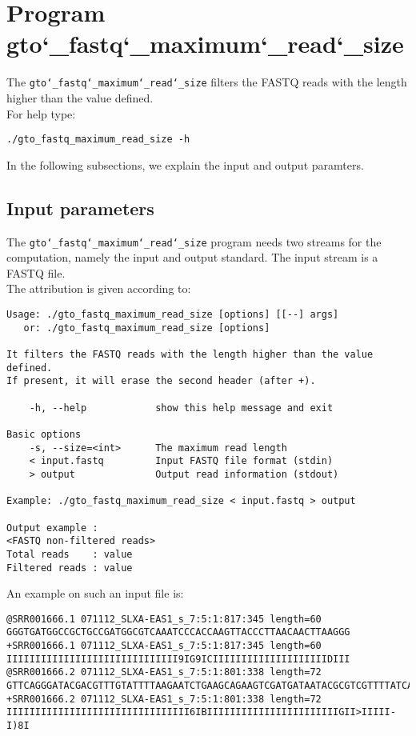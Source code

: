 \section{Program gto\char`_fastq\char`_maximum\char`_read\char`_size}
The \texttt{gto\char`_fastq\char`_maximum\char`_read\char`_size} filters the FASTQ reads with the length higher than the value defined.\\
For help type:
\begin{lstlisting}
./gto_fastq_maximum_read_size -h
\end{lstlisting}
In the following subsections, we explain the input and output paramters.

\subsection*{Input parameters}

The \texttt{gto\char`_fastq\char`_maximum\char`_read\char`_size} program needs two streams for the computation,
namely the input and output standard. The input stream is a FASTQ file.\\
The attribution is given according to:
\begin{lstlisting}
Usage: ./gto_fastq_maximum_read_size [options] [[--] args]
   or: ./gto_fastq_maximum_read_size [options]

It filters the FASTQ reads with the length higher than the value defined. 
If present, it will erase the second header (after +).

    -h, --help            show this help message and exit

Basic options
    -s, --size=<int>      The maximum read length
    < input.fastq         Input FASTQ file format (stdin)
    > output              Output read information (stdout)

Example: ./gto_fastq_maximum_read_size < input.fastq > output

Output example :
<FASTQ non-filtered reads>
Total reads    : value
Filtered reads : value
\end{lstlisting}
An example on such an input file is:
\begin{lstlisting}
@SRR001666.1 071112_SLXA-EAS1_s_7:5:1:817:345 length=60
GGGTGATGGCCGCTGCCGATGGCGTCAAATCCCACCAAGTTACCCTTAACAACTTAAGGG
+SRR001666.1 071112_SLXA-EAS1_s_7:5:1:817:345 length=60
IIIIIIIIIIIIIIIIIIIIIIIIIIIIII9IG9ICIIIIIIIIIIIIIIIIIIIIDIII
@SRR001666.2 071112_SLXA-EAS1_s_7:5:1:801:338 length=72
GTTCAGGGATACGACGTTTGTATTTTAAGAATCTGAAGCAGAAGTCGATGATAATACGCGTCGTTTTATCAT
+SRR001666.2 071112_SLXA-EAS1_s_7:5:1:801:338 length=72
IIIIIIIIIIIIIIIIIIIIIIIIIIIIIIII6IBIIIIIIIIIIIIIIIIIIIIIIIGII>IIIII-I)8I
\end{lstlisting}

